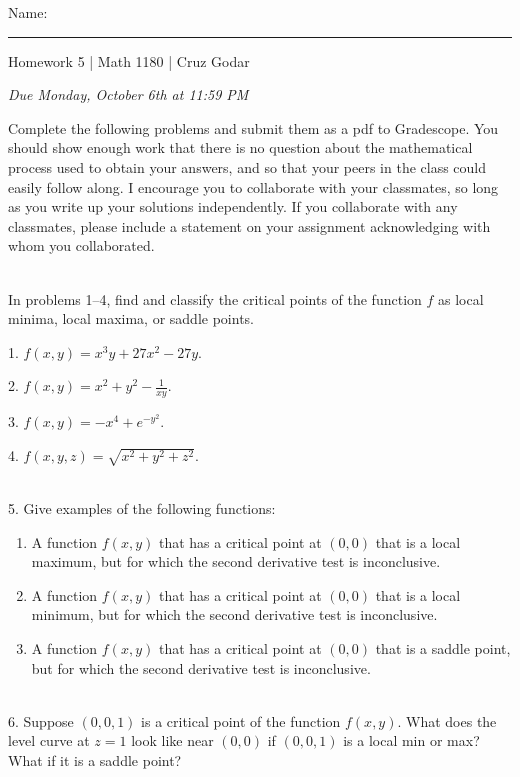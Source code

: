 \documentclass{article}
\begin{document}
\Large Name: \rule{2in}{0.15mm} \hfill Homework 5 | Math 1180 | Cruz Godar \vspace{4pt} \normalsize

\textit{Due Monday, October 6th at 11:59 PM}

Complete the following problems and submit them as a pdf to Gradescope. You should show enough work that there is no question about the mathematical process used to obtain your answers, and so that your peers in the class could easily follow along. I encourage you to collaborate with your classmates, so long as you write up your solutions independently. If you collaborate with any classmates, please include a statement on your assignment acknowledging with whom you collaborated.

~\\

In problems 1--4, find and classify the critical points of the function $f$ as local minima, local maxima, or saddle points.

1. $f(x, y) = x^3y + 27x^2 - 27y$.

2. $f(x, y) = x^2 + y^2 - \frac{1}{xy}$.

3. $f(x, y) = -x^4 + e^{-y^{2}}$.

4. $f(x, y, z) = \sqrt{x^2 + y^2 + z^2}$.

~\\

5. Give examples of the following functions:

\begin{enumerate}

	\item A function $f(x, y)$ that has a critical point at $(0, 0)$ that is a local maximum, but for which the second derivative test is inconclusive.

	\item A function $f(x, y)$ that has a critical point at $(0, 0)$ that is a local minimum, but for which the second derivative test is inconclusive.

	\item A function $f(x, y)$ that has a critical point at $(0, 0)$ that is a saddle point, but for which the second derivative test is inconclusive.

\end{enumerate}

~\\

6. Suppose $(0, 0, 1)$ is a critical point of the function $f(x, y)$. What does the level curve at $z = 1$ look like near $(0, 0)$ if $(0, 0, 1)$ is a local min or max? What if it is a saddle point?
\end{document}
